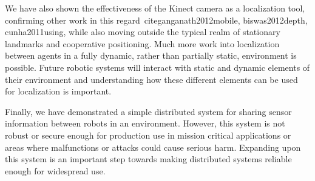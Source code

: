 \documentclass[thesis.tex]{subfile}
\begin{document}
We have also shown the effectiveness of the Kinect camera as a localization tool, confirming other work in this regard~cite{ganganath2012mobile, biswas2012depth, cunha2011using}, while also moving outside the typical realm of stationary landmarks and cooperative positioning. Much more work into localization between agents in a fully dynamic, rather than partially static, environment is possible. Future robotic systems will interact with static and dynamic elements of their environment and understanding how these different elements can be used for localization is important.

Finally, we have demonstrated a simple distributed system for sharing sensor information between robots in an environment. However, this system is not robust or secure enough for production use in mission critical applications or areas where malfunctions or attacks could cause serious harm. Expanding upon this system is an important step towards making distributed systems reliable enough for widespread use.

\end{document}

